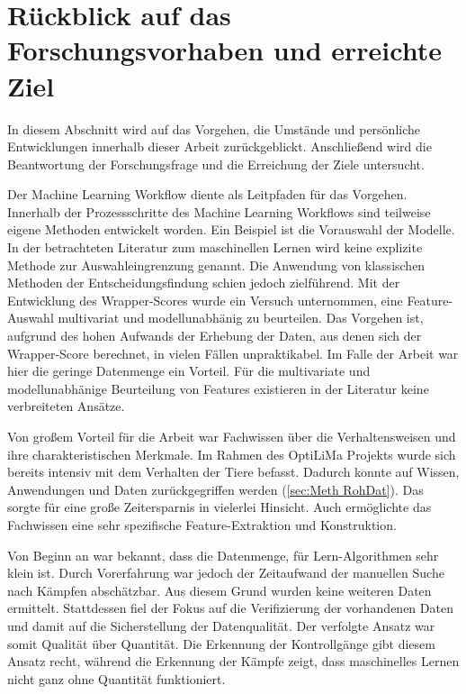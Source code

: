 \section{Rückblick auf das Forschungsvorhaben und erreichte Ziel}\label{sec:FrageundZiele!}

In diesem Abschnitt wird auf das Vorgehen, die Umstände und persönliche Entwicklungen innerhalb dieser Arbeit zurückgeblickt. Anschließend wird die Beantwortung der Forschungsfrage und die Erreichung der Ziele untersucht.

Der Machine Learning Workflow diente als Leitpfaden für das Vorgehen. Innerhalb der Prozessschritte des Machine Learning Workflows sind teilweise eigene Methoden entwickelt worden. Ein Beispiel ist die Vorauswahl der Modelle. In der betrachteten Literatur zum maschinellen Lernen wird keine explizite Methode zur Auswahleingrenzung genannt. Die Anwendung von klassischen Methoden der Entscheidungsfindung schien jedoch zielführend. Mit der Entwicklung des Wrapper-Scores wurde ein Versuch unternommen, eine Feature-Auswahl multivariat und modellunabhänig zu beurteilen. Das Vorgehen ist, aufgrund des hohen Aufwands der Erhebung der Daten, aus denen sich der Wrapper-Score berechnet, in vielen Fällen unpraktikabel. Im Falle der Arbeit war hier die geringe Datenmenge ein Vorteil. Für die  multivariate und modellunabhänige Beurteilung von Features existieren in der Literatur keine verbreiteten Ansätze. \par

Von großem Vorteil für die Arbeit war Fachwissen über die Verhaltensweisen und ihre charakteristischen Merkmale. Im Rahmen des \acrshort{OptiLiMa} Projekts wurde sich bereits intensiv mit dem Verhalten der Tiere befasst. Dadurch konnte auf Wissen, Anwendungen und Daten zurückgegriffen werden (\ref{sec:Meth RohDat}). Das sorgte für eine große Zeitersparnis in vielerlei Hinsicht. Auch ermöglichte das Fachwissen eine sehr spezifische Feature-Extraktion und Konstruktion. \par

Von Beginn an war bekannt, dass die Datenmenge, für Lern-Algorithmen sehr klein ist. Durch Vorerfahrung war jedoch der Zeitaufwand der manuellen Suche nach Kämpfen abschätzbar. Aus diesem Grund wurden keine weiteren Daten ermittelt. Stattdessen fiel der Fokus auf die Verifizierung der vorhandenen Daten und damit auf die Sicherstellung der Datenqualität. Der verfolgte Ansatz war somit Qualität über Quantität. Die Erkennung der Kontrollgänge gibt diesem Ansatz recht, während die Erkennung der Kämpfe zeigt, dass maschinelles Lernen nicht ganz ohne Quantität funktioniert. \par

